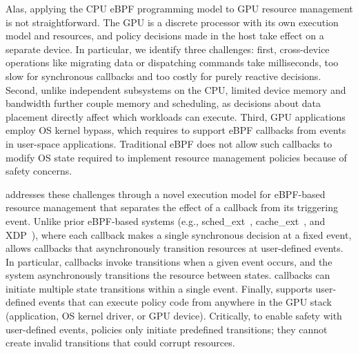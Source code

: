 Alas, applying the CPU eBPF programming model to GPU resource management is not straightforward.
The GPU is a discrete processor with its own execution model and resources, and policy decisions made in the host take effect on a separate device.
In particular, we identify three challenges: first, cross-device operations like migrating data or dispatching commands take milliseconds, too slow for synchronous callbacks and too costly for purely reactive decisions.
Second, unlike independent subsystems on the CPU, limited device memory and bandwidth further couple memory and scheduling, as decisions about data placement directly affect which workloads can execute.
Third, GPU applications employ OS kernel bypass, which requires \sys{} to support eBPF callbacks from events in user-space applications.
Traditional eBPF does not allow such callbacks to modify OS state required to implement resource management policies because of safety concerns.

\sys{} addresses these challenges through a novel execution model for eBPF-based resource management that separates the effect of a callback from its triggering event.
Unlike prior eBPF-based systems (e.g., sched\_ext~\cite{schedext-docs}, cache\_ext~\cite{zussman2025cache_ext}, and XDP~\cite{bachl2021flow}), where each callback makes a single synchronous decision at a fixed event, \sys{} allows callbacks that asynchronously transition resources at user-defined events.
In particular, \sys callbacks invoke transitions when a given event occurs, and the system asynchronously transitions the resource between states.
\sys{} callbacks can initiate multiple state transitions within a single event.
Finally, \sys{} supports user-defined events that can execute policy code from anywhere in the GPU stack (application, OS kernel driver, or GPU device).
Critically, to enable safety with user-defined events, \sys{} policies only initiate predefined transitions; they cannot create invalid transitions that could corrupt resources.


